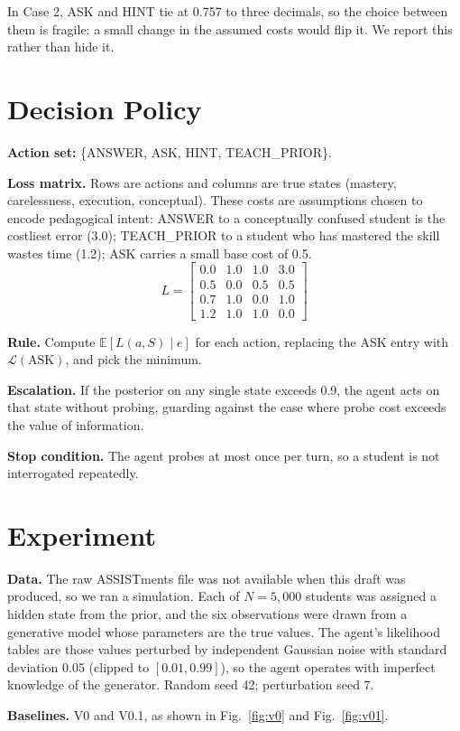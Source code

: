 \documentclass[10pt,letterpaper,twocolumn]{article}
\begin{document}
In Case 2, ASK and HINT tie at 0.757 to three decimals, so the choice between them is fragile: a small change in the assumed costs would flip it. We report this rather than hide it.

\section{Decision Policy}\label{sec:policy}
\textbf{Action set:} \{ANSWER, ASK, HINT, TEACH\_PRIOR\}.

\textbf{Loss matrix.} Rows are actions and columns are true states (mastery, carelessness, execution, conceptual). These costs are assumptions chosen to encode pedagogical intent: ANSWER to a conceptually confused student is the costliest error (3.0); TEACH\_PRIOR to a student who has mastered the skill wastes time (1.2); ASK carries a small base cost of 0.5.
\[
L=\begin{bmatrix}
0.0 & 1.0 & 1.0 & 3.0\\
0.5 & 0.0 & 0.5 & 0.5\\
0.7 & 1.0 & 0.0 & 1.0\\
1.2 & 1.0 & 1.0 & 0.0
\end{bmatrix}
\]

\textbf{Rule.} Compute $\mathbb{E}[L(a,S)\mid e]$ for each action, replacing the ASK entry with $\mathcal{L}(\text{ASK})$, and pick the minimum.

\textbf{Escalation.} If the posterior on any single state exceeds 0.9, the agent acts on that state without probing, guarding against the case where probe cost exceeds the value of information.

\textbf{Stop condition.} The agent probes at most once per turn, so a student is not interrogated repeatedly.

\section{Experiment}\label{sec:exp}
\textbf{Data.} The raw ASSISTments file was not available when this draft was produced, so we ran a simulation. Each of $N=5{,}000$ students was assigned a hidden state from the prior, and the six observations were drawn from a generative model whose parameters are the true values. The agent's likelihood tables are those values perturbed by independent Gaussian noise with standard deviation 0.05 (clipped to $[0.01,0.99]$), so the agent operates with imperfect knowledge of the generator. Random seed 42; perturbation seed 7.

\textbf{Baselines.} V0 and V0.1, as shown in Fig.~\ref{fig:v0} and Fig.~\ref{fig:v01}.
\end{document}
